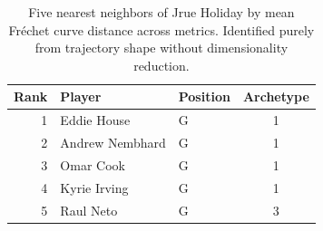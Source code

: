 \begin{table}[htbp]
  \centering\small
  \begin{tabular}{rllc}
    \toprule
    Rank & Player & Position & Archetype \\
    \midrule
    1 & Eddie House & G & 1 \\
    2 & Andrew Nembhard & G & 1 \\
    3 & Omar Cook & G & 1 \\
    4 & Kyrie Irving & G & 1 \\
    5 & Raul Neto & G & 3 \\
    \bottomrule
  \end{tabular}
  \caption{Five nearest neighbors of Jrue Holiday by mean Fr\'{e}chet curve distance across metrics. Identified purely from trajectory shape without dimensionality reduction.}
  \label{tab:Jrue_Holiday_frechet_curve_neighbors}
\end{table}

